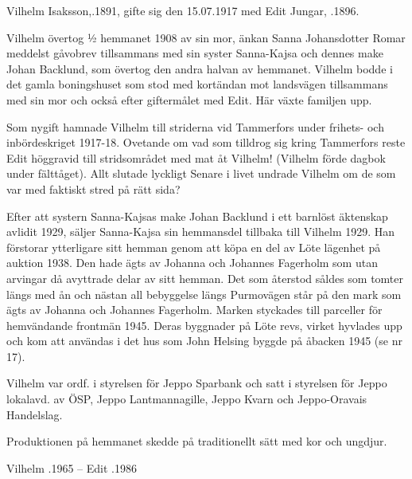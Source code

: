 Vilhelm Isaksson,.1891, gifte sig den 15.07.1917 med Edit Jungar, .1896.

Vilhelm  övertog  ½ hemmanet 1908 av sin mor, änkan Sanna Johansdotter Romar meddelst gåvobrev tillsammans med sin syster Sanna-Kajsa och dennes make Johan Backlund, som övertog den andra halvan av hemmanet. Vilhelm bodde i det  gamla boningshuset som stod med kortändan mot landsvägen tillsammans med sin mor och också efter giftermålet med Edit. Här växte familjen upp.

Som nygift hamnade Vilhelm till striderna vid Tammerfors under frihets- och inbördeskriget 1917-18. Ovetande om vad som tilldrog sig kring Tammerfors reste Edit höggravid till stridsområdet med mat åt Vilhelm! (Vilhelm förde dagbok under fälttåget). Allt slutade lyckligt Senare i livet undrade Vilhelm om de som var med faktiskt stred på rätt sida?

Efter att systern Sanna-Kajsas make Johan Backlund i ett barnlöst äktenskap avlidit 1929, säljer Sanna-Kajsa sin hemmansdel tillbaka till Vilhelm 1929. Han förstorar ytterligare sitt hemman genom att köpa en del av Löte lägenhet på auktion 1938. Den hade ägts av Johanna och Johannes Fagerholm som utan arvingar då  avyttrade  delar av sitt hemman. Det som återstod såldes som tomter längs med ån och nästan all bebyggelse längs Purmovägen står på den mark som ägts av Johanna och Johannes Fagerholm. Marken styckades till parceller för hemvändande frontmän 1945. Deras byggnader på Löte revs, virket hyvlades upp och kom att användas i det hus som John Helsing byggde på åbacken 1945 (se nr 17).

Vilhelm var ordf. i styrelsen för Jeppo Sparbank och satt i styrelsen för Jeppo lokalavd. av ÖSP, Jeppo Lantmannagille, Jeppo Kvarn och Jeppo-Oravais Handelslag.
\begin{jhchildren}
  \item {}
  \item {}
  \item {}
  \item {}
\end{jhchildren}
Produktionen på hemmanet skedde på traditionellt sätt med kor och ungdjur.

Vilhelm .1965  --  Edit .1986


